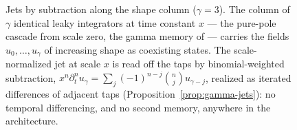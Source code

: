 \begin{figure}[t]
\begin{tikzpicture}[every node/.style={font=\small}, line cap=round, >=stealth,
  sect/.style={draw, minimum width=1.5cm, minimum height=0.62cm, inner sep=2pt},
  sum/.style={draw, circle, inner sep=1.0pt}]
\end{tikzpicture}
\caption{Jets by subtraction along the shape column ($\gamma = 3$). The column of
$\gamma$ identical leaky integrators at time constant $x$ --- the pure-pole cascade from
scale zero, the gamma memory of  --- carries the fields
$u_0, \dots, u_\gamma$ of increasing shape as coexisting states. The scale-normalized jet
at scale $x$ is read off the taps by binomial-weighted subtraction,
$x^n\partial_t^n u_\gamma = \sum_j (-1)^{n-j}\binom{n}{j}u_{\gamma-j}$, realized as
iterated differences of adjacent taps
(Proposition~\ref{prop:gamma-jets}): no temporal differencing, and no second memory,
anywhere in the architecture.}
\label{fig:jet-taps}
\end{figure}
